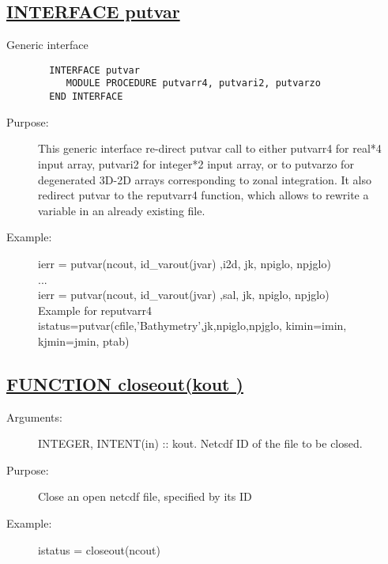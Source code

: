 \documentclass[a4paper,11pt]{article}
\begin{document}
\newpage
\subsection*{\underline{ INTERFACE putvar}}
\begin{description}
\item[Generic interface]  
\begin{small} \begin{verbatim}
  INTERFACE putvar
     MODULE PROCEDURE putvarr4, putvari2, putvarzo
  END INTERFACE
\end{verbatim} \end{small}
\item[Purpose:] This generic interface re-direct putvar call to either putvarr4 for real*4 input array, putvari2 for integer*2 input array, or
to putvarzo for degenerated 3D-2D arrays corresponding to zonal integration. It also redirect putvar to the reputvarr4 function, which allows to 
rewrite a variable in an already existing file.
\item[Example:] 
ierr = putvar(ncout, id\_varout(jvar) ,i2d, jk, npiglo, npjglo)   \\
... \\
ierr = putvar(ncout, id\_varout(jvar) ,sal, jk, npiglo, npjglo)  \\
Example for reputvarr4  \\
istatus=putvar(cfile,'Bathymetry',jk,npiglo,npjglo, kimin=imin, kjmin=jmin, ptab)


\end{description}


\subsection*{\underline{ FUNCTION closeout(kout )}}
\begin{description}
\item[Arguments:]  
INTEGER, INTENT(in) :: kout. Netcdf ID of the file to be closed.
\item[Purpose:] Close an open netcdf file, specified by its ID
\item[Example:]  istatus = closeout(ncout)
\end{description}
\end{document}
